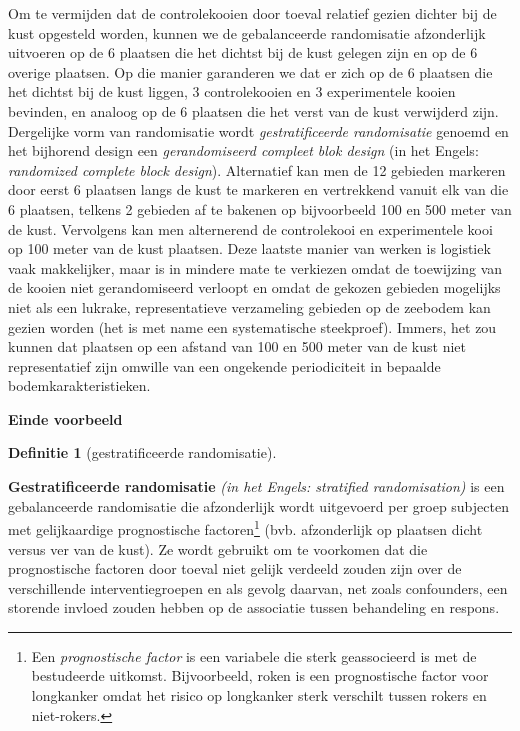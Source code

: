 \documentclass[
  12pt,dutch,coursenotes]{book}
\theoremstyle{definition}
\newtheorem{definition}{Definitie}[chapter]
\theoremstyle{definition}
\theoremstyle{definition}
\theoremstyle{definition}
\theoremstyle{remark}
\begin{document}
Om te vermijden dat de controlekooien door toeval relatief gezien dichter bij de kust opgesteld worden, kunnen we de gebalanceerde randomisatie afzonderlijk uitvoeren op de 6 plaatsen die het dichtst bij de kust gelegen zijn en op de 6 overige plaatsen. Op die manier garanderen we dat er zich op de 6 plaatsen die het dichtst bij de kust liggen, 3 controlekooien en 3 experimentele kooien bevinden, en analoog op de 6 plaatsen die het verst van de kust verwijderd zijn. Dergelijke vorm van randomisatie wordt \emph{gestratificeerde randomisatie}
genoemd en het bijhorend design een \emph{gerandomiseerd compleet blok design} (in het Engels: \emph{randomized complete block design}). Alternatief kan men de 12 gebieden markeren door eerst 6 plaatsen langs de kust te markeren en vertrekkend vanuit elk van die 6 plaatsen, telkens 2 gebieden af te bakenen op bijvoorbeeld 100 en 500 meter van de kust. Vervolgens kan men alternerend de controlekooi en experimentele kooi op 100 meter van de kust plaatsen. Deze laatste manier van werken is logistiek vaak makkelijker, maar is in mindere mate te verkiezen omdat de toewijzing van de kooien niet gerandomiseerd verloopt en omdat de gekozen gebieden mogelijks niet als een lukrake, representatieve verzameling gebieden op de zeebodem kan gezien worden (het is met name een systematische steekproef). Immers, het zou kunnen dat plaatsen op een afstand van 100 en 500 meter van de kust niet representatief zijn omwille van een ongekende periodiciteit in bepaalde bodemkarakteristieken.

\textbf{Einde voorbeeld}

\begin{definition}[gestratificeerde randomisatie]
\protect\hypertarget{def:unnamed-chunk-72}{}{\label{def:unnamed-chunk-72} {} }
\end{definition}
\textbf{Gestratificeerde randomisatie} \emph{(in het Engels: stratified
randomisation)} is een gebalanceerde randomisatie die afzonderlijk wordt
uitgevoerd per groep subjecten met gelijkaardige prognostische factoren\footnote{Een \emph{prognostische factor} is een variabele die sterk geassocieerd is met de
  bestudeerde uitkomst. Bijvoorbeeld, roken is een prognostische factor voor
  longkanker omdat het risico op longkanker sterk verschilt tussen rokers en
  niet-rokers.}
(bvb. afzonderlijk op plaatsen dicht versus ver van de kust). Ze wordt gebruikt
om te voorkomen dat die prognostische factoren door toeval niet gelijk
verdeeld zouden zijn over de verschillende interventiegroepen en als gevolg
daarvan, net zoals confounders, een storende invloed zouden hebben op de
associatie tussen behandeling en respons.
\end{document}
